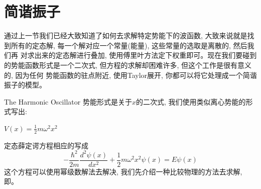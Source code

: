 \documentclass[a4paper,zihao=-4,linespread=1]{ctexrep}
\begin{document}
    \section{简谐振子}
    通过上一节我们已经大致知道了如何去求解特定势能下的波函数, 大致来说就是找到所有的定态解, 每一个解对应一个常量(能量), 这些常量的选取是离散的, 然后我们再
    对求出来的定态解进行叠加, 使用傅里叶方法定下权重即可。现在我们要碰到的势能函数形式是一个二次式, 但方程的求解却困难许多, 但这个工作是很有意义的, 因为任何
    势能函数的驻点附近, 使用Taylor展开, 你都可以将它处理成一个简谐振子的模型。
    \begin{define}{The Harmonic Oscillator}
        势能形式是关于$x$的二次式, 我们使用类似离心势能的形式写出:
        \begin{center}
            \begin{math}
                \displaystyle
                V(x)=\frac{1}{2}m\omega^2x^2
            \end{math}
        \end{center}
    \end{define}
    定态薛定谔方程相应的写成$$-\frac{\hbar^2}{2m}\frac{d^2\psi(x)}{dx^2}+\frac{1}{2}m\omega^2x^2\psi(x)=E\psi(x)$$
    这个方程可以使用幂级数解法去解决, 我们先介绍一种比较物理的方法去求解, 即。
\end{document}
